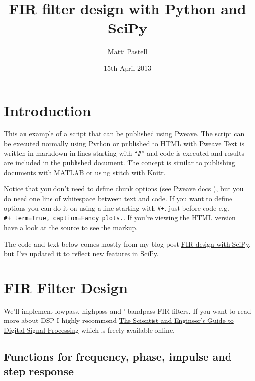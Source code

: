\documentclass[a4paper,11pt,final]{article}
\title{ FIR filter design with Python and SciPy}
\author{ Matti Pastell}
\date{ 15th April 2013}
\begin{document}
\maketitle
\section{Introduction}\label{introduction}

This an example of a script that can be published using
\href{http://mpastell.com/pweave}{Pweave}. The script can be executed
normally using Python or published to HTML with Pweave Text is written
in markdown in lines starting with ``\texttt{\#\textquotesingle{}}'' and
code is executed and results are included in the published document. The
concept is similar to publishing documents with
\href{http://mathworks.com}{MATLAB} or using stitch with
\href{http://http://yihui.name/knitr/demo/stitch/}{Knitr}.

Notice that you don't need to define chunk options (see
\href{http://mpastell.com/pweave/usage.html\#code-chunk-options}{Pweave
docs} ), but you do need one line of whitespace between text and code.
If you want to define options you can do it on using a line starting
with \texttt{\#+}. just before code e.g.
\texttt{\#+\ term=True,\ caption=\textquotesingle{}Fancy\ plots.\textquotesingle{}}.
If you're viewing the HTML version have a look at the
\href{FIR_design.py}{source} to see the markup.

The code and text below comes mostly from my blog post
\href{http://mpastell.com/2010/01/18/fir-with-scipy/}{FIR design with
SciPy}, but I've updated it to reflect new features in SciPy.

\section{FIR Filter Design}\label{fir-filter-design}

We'll implement lowpass, highpass and ' bandpass FIR filters. If you
want to read more about DSP I highly recommend
\href{http://www.dspguide.com/}{The Scientist and Engineer's Guide to
Digital Signal Processing} which is freely available online.

\subsection{Functions for frequency, phase, impulse and step
response}\label{functions-for-frequency-phase-impulse-and-step-response}
\end{document}
